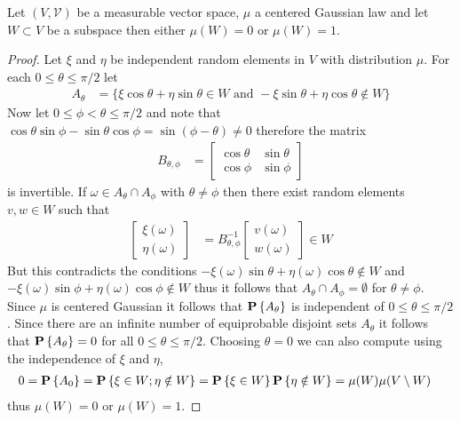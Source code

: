 \begin{thm}\label{CenteredGaussian01}Let $(V, \mathcal{V})$ be a measurable vector space, $\mu$ a centered Gaussian law  and let $W \subset V$ be a subspace then either $\mu(W)=0$ or $\mu(W) =1 $.
\end{thm}
\begin{proof}
Let $\xi$ and $\eta$ be independent random elements in $V$ with distribution $\mu$.  For each $0 \leq \theta \leq \pi/2$ let 
\begin{align*}
A_\theta &= \lbrace \xi \cos \theta + \eta \sin \theta \in W \text{ and } -\xi \sin \theta + \eta \cos \theta \notin W \rbrace
\end{align*}
Now let $0 \leq \phi < \theta \leq \pi/2$ and note that $\cos \theta \sin \phi - \sin \theta \cos \phi = \sin (\phi - \theta) \neq 0$ therefore the matrix
\begin{align*}
B_{\theta, \phi} &= \begin{bmatrix}
\cos \theta & \sin \theta \\
\cos \phi & \sin \phi
\end{bmatrix}
\end{align*}
is invertible.  If $\omega \in A_\theta \cap A_\phi$ with $\theta \neq \phi$ then there exist random elements $v, w \in W$ such that
\begin{align*}
\begin{bmatrix}
\xi (\omega) \\
\eta(\omega)
\end{bmatrix}
&= B_{\theta, \phi}^{-1} 
\begin{bmatrix}
v (\omega) \\
w (\omega)
\end{bmatrix}
\in W
\end{align*}
But this contradicts the conditions $-\xi(\omega) \sin \theta + \eta(\omega) \cos \theta \notin W$ and $-\xi(\omega) \sin \phi + \eta(\omega) \cos \phi \notin W$ thus it follows
that $A_\theta \cap A_\phi = \emptyset$ for $\theta \neq \phi$.  Since $\mu$ is centered Gaussian it follows that $\textbf{P}\left \{A_\theta \right \}$ is independent of $0 \leq \theta \leq \pi/2$.  Since there are an infinite number of equiprobable disjoint sets $A_\theta$ it follows that $\textbf{P}\left \{A_\theta \right \} = 0$ for all $0 \leq \theta \leq \pi/2$.
Choosing $\theta = 0$ we can also compute using the independence of $\xi$ and $\eta$,
\begin{align*}
0 &= \textbf{P}\left \{A_0 \right \} = \textbf{P}\left \{\xi \in W; \eta \notin W \right \} = \textbf{P}\left \{\xi \in W \right \} \textbf{P}\left \{\eta \notin W \right \} = \mu(W) \mu(V \setminus W)
\end{align*}
thus $\mu(W) = 0$ or  $\mu(W) = 1$.
\end{proof}

